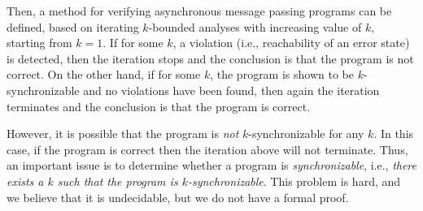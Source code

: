 Then, a method for verifying asynchronous message passing programs can be defined, 
based on iterating $k$-bounded analyses with increasing value of $k$, starting from $k=1$. If for some $k$, a violation (i.e., reachability of an error state) is detected, then the iteration stops and the conclusion is that the program is not correct. On the other hand, if for some $k$, the program is shown to be $k$-synchronizable and no violations have been found, then again the iteration terminates and the conclusion is that the program is correct. 

However, it is possible that the program is {\em not} $k$-synchronizable for any $k$. In this case, if the program is correct then the iteration above will not terminate. Thus, an important issue is to determine whether a program is {\em synchronizable}, i.e., {\em there exists a $k$ such that the program is $k$-synchronizable}. This problem is hard, and we believe that it is undecidable, but we do not have a formal proof. 
%
